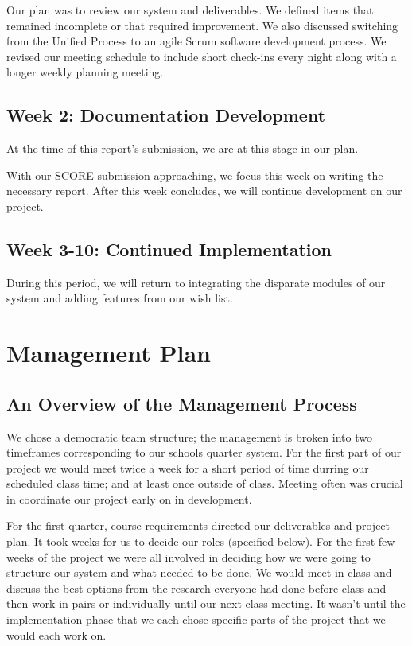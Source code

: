 \documentclass[12pt]{article}
\begin{document}
Our plan was to review our system and deliverables. We defined items that remained incomplete or that required improvement. We also discussed switching from the Unified Process to an agile Scrum software development process. We revised our meeting schedule to include short check-ins every night along with a longer weekly planning meeting. 

\subsection*{Week 2: Documentation Development}

At the time of this report's submission, we are at this stage in our plan.

With our SCORE submission approaching, we focus this week on writing the necessary report. After this week concludes, we will continue development on our project.

\subsection*{Week 3-10: Continued Implementation}

During this period, we will return to integrating the disparate modules of our system and adding features from our wish list.

\section{Management Plan} %

\subsection{An Overview of the Management Process}
We chose a democratic team structure; the management is broken into two timeframes corresponding to our schools quarter system. For the first part of our project we would meet twice a week for a short period of time durring our scheduled class time; and at least once outside of class. Meeting often was crucial in coordinate our project early on in development.

For the first quarter, course requirements directed our deliverables and project plan. It took weeks for us to decide our roles (specified below). For the first few weeks of the project we were all involved in deciding how we were going to structure our system and what needed to be done. We would meet in class and discuss the best options from the research everyone had done before class and then work in pairs or individually until our next class meeting. It wasn't until the implementation phase that we each chose specific parts of the project that we would each work on. 
 
\end{document}
